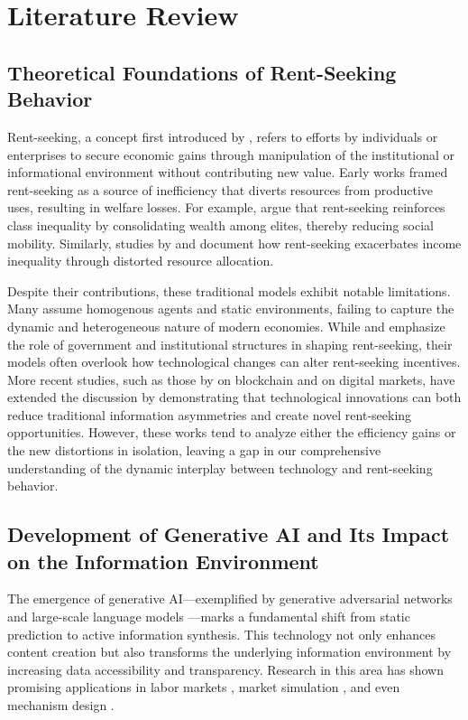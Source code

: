 \section{Literature Review}
\label{sec:lit_review}

\subsection{Theoretical Foundations of Rent-Seeking Behavior}

Rent-seeking, a concept first introduced by \citet{tullock2008welfare}, refers to efforts by individuals or enterprises to secure economic gains through manipulation of the institutional or informational environment without contributing new value. Early works framed rent-seeking as a source of inefficiency that diverts resources from productive uses, resulting in welfare losses. For example, \citet{acemoglu2015democracy} argue that rent-seeking reinforces class inequality by consolidating wealth among elites, thereby reducing social mobility. Similarly, studies by \citet{rodriguez2004inequality} and \citet{stiglitz2012price} document how rent-seeking exacerbates income inequality through distorted resource allocation.

Despite their contributions, these traditional models exhibit notable limitations. Many assume homogenous agents and static environments, failing to capture the dynamic and heterogeneous nature of modern economies. While \citet{krueger2008political} and \citet{zingales2017towards} emphasize the role of government and institutional structures in shaping rent-seeking, their models often overlook how technological changes can alter rent-seeking incentives. More recent studies, such as those by \citet{catalini2020some} on blockchain and \citet{prat2022attention} on digital markets, have extended the discussion by demonstrating that technological innovations can both reduce traditional information asymmetries and create novel rent-seeking opportunities. However, these works tend to analyze either the efficiency gains or the new distortions in isolation, leaving a gap in our comprehensive understanding of the dynamic interplay between technology and rent-seeking behavior.

\subsection{Development of Generative AI and Its Impact on the Information Environment}

The emergence of generative AI—exemplified by generative adversarial networks \citep{goodfellow2014generative} and large-scale language models \citep{brown2020language}—marks a fundamental shift from static prediction to active information synthesis. This technology not only enhances content creation but also transforms the underlying information environment by increasing data accessibility and transparency. Research in this area has shown promising applications in labor markets \citep{zarifhonarvar2024economics, hui2024short}, market simulation \citep{takahashi2019modeling, xu2019modeling}, and even mechanism design \citep{calvano2020artificial}.

